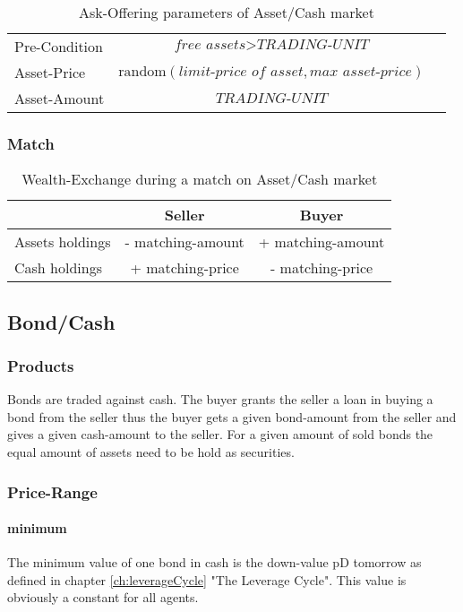 \documentclass[Bachelorarbeit.tex]{subfiles}
\begin{document}
\begin{table}[H]
	\centering
	\caption{Ask-Offering parameters of Asset/Cash market}
	\begin{tabular} { l c r }
		\hline
		Pre-Condition & $\textit{free assets} > \textit{TRADING-UNIT}$  \\
		Asset-Price & $\mathrm{random}(\textit{limit-price of asset}, \textit{max asset-price})$ \\
		Asset-Amount & $\textit{TRADING-UNIT}$ \\
		\hline
	\end{tabular}
\end{table}


\subsubsection{Match}

\begin{table}[H]
	\centering
	\caption{Wealth-Exchange during a match on Asset/Cash market}
	\begin{tabular} { l c c }
		& Seller & Buyer \\
		\hline
		Assets holdings & - matching-amount & + matching-amount \\
		Cash holdings  & + matching-price & - matching-price \\
		\hline
	\end{tabular}
\end{table}

\subsection{Bond/Cash}
\subsubsection{Products}
Bonds are traded against cash. The buyer grants the seller a loan in buying a bond from the seller thus the buyer gets a given bond-amount from the seller and gives a given cash-amount to the seller. For a given amount of sold bonds the equal amount of assets need to be hold as securities.

\subsubsection{Price-Range}

\paragraph{minimum}
The minimum value of one bond in cash is the down-value pD tomorrow as defined in chapter \ref{ch:leverageCycle} "The Leverage Cycle". This value is obviously a constant for all agents.
\end{document}
